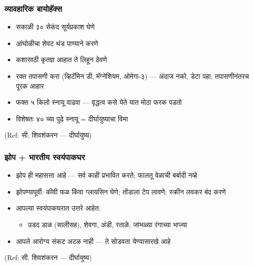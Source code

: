 \begin{frame}[fragile]\frametitle{व्यावहारिक बायोहॅक्स}

	\begin{itemize}
	\item सकाळी ३० सेकंद सूर्यप्रकाश घेणे
	\item आंघोळीचा शेवट थंड पाण्याने करणे
	\item कशासाठी कृतज्ञ आहात ते लिहून ठेवणे
	\item रक्त तपासणी करा (व्हिटॅमिन डी, मॅग्नेशियम, ओमेगा-३) --- अंदाज नको, डेटा पहा; तपासणीनंतरच पूरक आहार
	\item फक्त ५ किलो स्नायू वाढवा --- वृद्धत्व कसे येते यात मोठा फरक पडतो
	\item विशेषतः ४० च्या पुढे स्नायू = दीर्घायुष्याचा विमा
	\end{itemize}

{\tiny (Ref: सी. शिवशंकरन --- दीर्घायुष्य)}

\end{frame}

\begin{frame}[fragile]\frametitle{झोप + भारतीय स्वयंपाकघर}

	\begin{itemize}
	\item झोप ही महासत्ता आहे --- सर्व काही प्रभावित करते; फालतू वेळाची बर्बादी नव्हे
	\item झोपण्यापूर्वी: कीवी फळ किंवा ग्लायसिन घेणे; तोंडाला टेप लावणे; स्क्रीन लवकर बंद करणे
	\item आपल्या स्वयंपाकघरात उत्तरे आहेत:
		\begin{itemize}
		\item उडद डाळ (सालीसह), शेवगा, अंडी, रताळे, जांभळ्या रंगाच्या भाज्या
		\end{itemize}
	\item आपले आरोग्य संकट अटळ नाही --- ते सोडवता येण्यासारखे आहे
	\end{itemize}

{\tiny (Ref: सी. शिवशंकरन --- दीर्घायुष्य)}

\end{frame}
